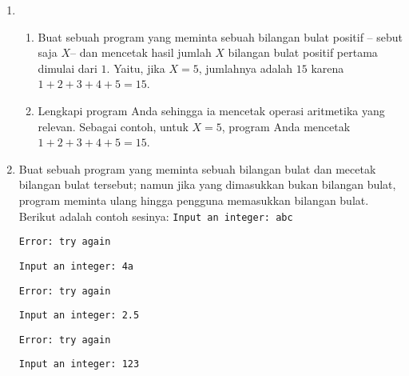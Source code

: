 \documentclass[14pt]{extarticle}
\begin{document}
\begin{enumerate}
	\item 
	\begin{enumerate}
		\item Buat sebuah program yang meminta sebuah bilangan bulat positif -- sebut saja $X$-- dan mencetak hasil jumlah $X$ bilangan bulat positif pertama dimulai dari $1$. Yaitu, jika $X=5$, jumlahnya adalah $15$ karena $1+2+3+4+5=15$.
		\item Lengkapi program Anda sehingga ia mencetak operasi aritmetika yang relevan. Sebagai contoh, untuk $X=5$, program Anda mencetak $1+2+3+4+5=15$.
	\end{enumerate}
	\item Buat sebuah program yang meminta sebuah bilangan bulat dan mecetak bilangan bulat tersebut; namun jika yang dimasukkan bukan bilangan bulat, program meminta ulang hingga pengguna memasukkan bilangan bulat. Berikut adalah contoh sesinya:
	\texttt{Input an integer: abc}
	
	\texttt{Error: try again}
	
	\texttt{Input an integer: 4a}
	
	\texttt{Error: try again}
	
	\texttt{Input an integer: 2.5}
	
	\texttt{Error: try again}
	
	\texttt{Input an integer: 123}
	

\end{enumerate}
\end{document}
